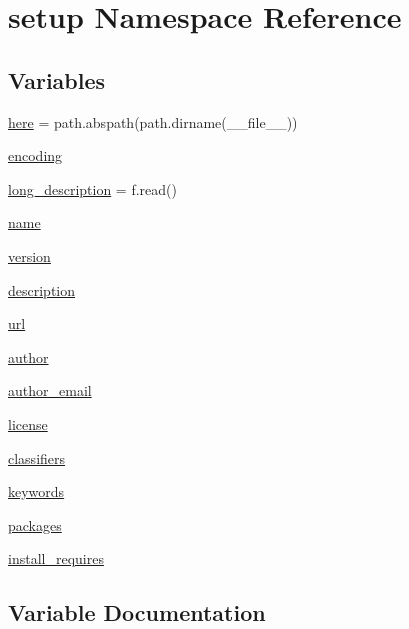 \hypertarget{namespacesetup}{}\section{setup Namespace Reference}
\label{namespacesetup}
\subsection*{Variables}
\begin{DoxyCompactItemize}
\item 
\hyperlink{namespacesetup_a9c076537d899ffd8096e58c282bb7b02}{here} = path.\+abspath(path.\+dirname(\+\_\+\+\_\+file\+\_\+\+\_\+))
\item 
\hyperlink{namespacesetup_a443be2d01fd539bf6761aff70724d876}{encoding}
\item 
\hyperlink{namespacesetup_a4cda9dbfb952875376a0749fe08a5bde}{long\+\_\+description} = f.\+read()
\item 
\hyperlink{namespacesetup_ab3a7a0638d76a01367c5bc3cc699447f}{name}
\item 
\hyperlink{namespacesetup_a2aa722b36a933088812b50ea79b97a5c}{version}
\item 
\hyperlink{namespacesetup_aedf461ec52a946bda975938ba0b93ec0}{description}
\item 
\hyperlink{namespacesetup_afc13124aa5c0124e84e1d965e3f4b0fb}{url}
\item 
\hyperlink{namespacesetup_a3a57a4772d418a06835249cbade0d86a}{author}
\item 
\hyperlink{namespacesetup_a5b08034343aa2be607722a8b315f3625}{author\+\_\+email}
\item 
\hyperlink{namespacesetup_a8ed6f50a28bd6a8794f8e1153baa6de9}{license}
\item 
\hyperlink{namespacesetup_abe96a9c38c1c61f9f0fdb002c482f785}{classifiers}
\item 
\hyperlink{namespacesetup_a73ae9ecb109f0dcab6f0b6a89043c5c3}{keywords}
\item 
\hyperlink{namespacesetup_aff2375a361fd5865c77bd9aa093be747}{packages}
\item 
\hyperlink{namespacesetup_abead4f26b530856f858f0d44c7cf2588}{install\+\_\+requires}
\end{DoxyCompactItemize}


\subsection{Variable Documentation}
\mbox{\label{namespacesetup_a3a57a4772d418a06835249cbade0d86a}} 
